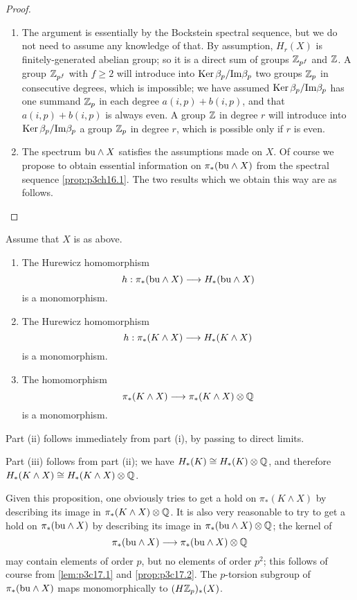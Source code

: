 \documentclass[../main]{subfiles}
\begin{document}
\begin{proof}
    \begin{enumerate}[label=(\roman*)]
        \item The argument is essentially by the Bockstein spectral sequence, but we do not need to assume any knowledge of that. By assumption, $H_r(X)$ is finitely-generated abelian group; so it is a direct sum of groups $\mathbb{Z}_{p^f}$ and $\mathbb{Z}$. A group $\mathbb{Z}_{p^f}$ with $f\ge2$ will introduce into $\operatorname{\mathrm{Ker}}\beta_p / \mathrm{Im}\beta_p$ two groups $\mathbb{Z}_p$ in consecutive degrees, which is impossible; we have assumed $\operatorname{\mathrm{Ker}}\beta_p / \mathrm{Im}\beta_p$ has one summand $\mathbb{Z}_p$ in each degree $a(i,p) + b(i,p)$, and that $a(i,p) + b(i,p)$ is always even. A group $\mathbb{Z}$ in degree $r$ will introduce into $\operatorname{\mathrm{Ker}}\beta_p / \mathrm{Im}\beta_p$ a group $\mathbb{Z}_p$ in degree $r$, which is possible only if $r$ is even.
        \item The spectrum $\mathrm{bu}\wedge X$ satisfies the assumptions made on $X$. Of course we propose to obtain essential information on $\pi_*(\mathrm{bu}\wedge X)$ from the spectral sequence \ref{prop:p3ch16.1}. The two results which we obtain this way are as follows.
    \end{enumerate}
\end{proof}
\begin{proposition} \label{prop:p3c17.2} Assume that $X$ is as above.
    \begin{enumerate}[label=(\roman*)]
        \item The Hurewicz homomorphism
        \[
        h : \pi_*(\mathrm{bu}\wedge X) \longrightarrow{} H_*(\mathrm{bu}\wedge X)
        \]
        is a monomorphism.
        \item The Hurewicz homomorphism
        \[
        h : \pi_*(K\wedge X) \longrightarrow{} H_*(K\wedge X)
        \]
        is a monomorphism.
        \item The homomorphism
        \[
        \pi_*(K\wedge X) \longrightarrow{} \pi_*(K\wedge X)\otimes\mathbb{Q}
        \]
        is a monomorphism.
    \end{enumerate}
\end{proposition}
Part (ii) follows immediately from part (i), by passing to direct
limits.

Part (iii) follows from part (ii); we have $H_*(K)\cong H_*(K)\otimes\mathbb{Q}$, and therefore $H_*(K\wedge X)\cong H_*(K\wedge X)\otimes\mathbb{Q}$.

Given this proposition, one obviously tries to get a hold on $\pi_*(K\wedge X)$ by describing its image in $\pi_*(K\wedge X)\otimes\mathbb{Q}$. It is also very reasonable to try to get a hold on $\pi_*(\mathrm{bu}\wedge X)$ by describing its image in $\pi_*(\mathrm{bu}\wedge X)\otimes\mathbb{Q}$; the
kernel of
\[
\pi_*(\mathrm{bu}\wedge X) \longrightarrow{} \pi_*(\mathrm{bu}\wedge X)\otimes\mathbb{Q}
\]
may contain elements of order $p$, but no elements of order $p^2$; this follows of course from \ref{lem:p3c17.1} and \ref{prop:p3c17.2}. The $p$-torsion subgroup of $\pi_*(\mathrm{bu}\wedge X)$ maps monomorphically to $(H\mathbb{Z}_p)_*(X)$.
\end{document}
